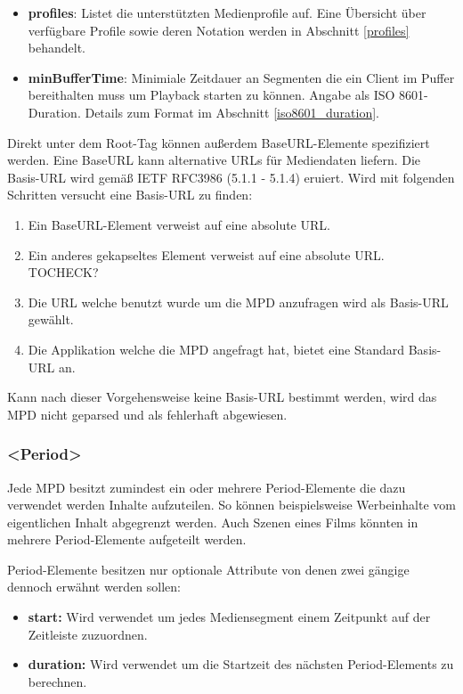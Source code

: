 \documentclass[paper = a4, fontsize = 12pt, parskip = half]{scrartcl} %
\begin{document}
\begin{itemize}
    \item \textbf{profiles}: Listet die unterstützten Medienprofile auf. Eine Übersicht über verfügbare Profile sowie deren Notation werden in Abschnitt \ref{profiles} behandelt.
    \item \textbf{minBufferTime}: Minimiale Zeitdauer an Segmenten die ein Client im Puffer bereithalten muss um Playback starten zu können. Angabe als ISO 8601-Duration. Details zum Format im Abschnitt \ref{iso8601_duration}.
\end{itemize}

Direkt unter dem Root-Tag können außerdem BaseURL-Elemente spezifiziert werden. Eine BaseURL kann alternative URLs für Mediendaten liefern.
Die Basis-URL wird gemäß IETF RFC3986 (5.1.1 - 5.1.4) eruiert. Wird mit folgenden Schritten versucht eine Basis-URL zu finden:

\begin{enumerate}
    \item Ein BaseURL-Element verweist auf eine absolute URL.
    \item Ein anderes gekapseltes Element verweist auf eine absolute URL. TOCHECK?
    \item Die URL welche benutzt wurde um die MPD anzufragen wird als Basis-URL gewählt.
    \item Die Applikation welche die MPD angefragt hat, bietet eine Standard Basis-URL an.
\end{enumerate}

Kann nach dieser Vorgehensweise keine Basis-URL bestimmt werden, wird das MPD nicht geparsed und als fehlerhaft abgewiesen.

\subsubsection{<Period>}
Jede MPD besitzt zumindest ein oder mehrere Period-Elemente die dazu verwendet werden Inhalte aufzuteilen. So können beispielsweise Werbeinhalte vom eigentlichen Inhalt abgegrenzt werden. Auch Szenen eines Films könnten in mehrere Period-Elemente aufgeteilt werden.

Period-Elemente besitzen nur optionale Attribute von denen zwei gängige dennoch erwähnt werden sollen:
\begin{itemize}
    \item \textbf{start:} Wird verwendet um jedes Mediensegment einem Zeitpunkt auf der Zeitleiste zuzuordnen.
    \item \textbf{duration:} Wird verwendet um die Startzeit des nächsten Period-Elements zu berechnen.
\end{itemize}
\end{document}
